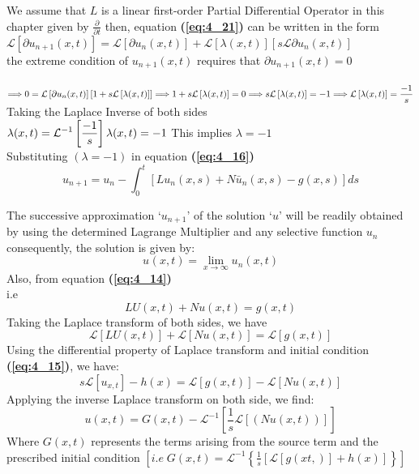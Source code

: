\documentclass[12pt]{report}
\newcommand{\Laplace}{\mathcal{L}}
\newcommand{\sbracket}[1]{\left[#1\right]}
\newcommand{\Un}[2]{u_{#1}(#2)}
\newcommand{\NI}{\noindent}
\newcommand{\InverseL}[1]{\Laplace^{-1}\left[#1\right]}
\newcommand{\LT}[1]{\Laplace \left[#1\right]}
\newcommand{\bt}[1]{\textbf{#1}}
\newcommand{\refn}[1]{\bt{(\ref{#1})}}
\begin{document}
\NI We assume that $L$ is a linear first-order Partial Differential Operator in this chapter given by $\displaystyle \frac{\partial}{\partial t}$ then, equation \refn{eq:4_21} can be written in the form\\[0.2cm]
$\displaystyle
\LT{\partial\Un{n+1}{x,t}} = \LT{\partial\Un{n}{x,t}} + \LT{\lambda(x,t)}\sbracket{s\Laplace \partial\Un{n}{x,t}}
$\\[0.2cm]
the extreme condition of $\Un{n+1}{x,t}$ requires that $\partial\Un{n+1}{x,t} = 0$\\[0.2cm]\
$\displaystyle
\Longrightarrow 0 = \LT{\partial\Un{n}{x,t}}\left[1 + s\LT{\lambda(x,t)}\right] \\[0.2cm]
\Longrightarrow 1 + s\LT{\lambda(x,t)} = 0 \\[0.2cm]
\Longrightarrow s\LT{\lambda(x,t)} = - 1 \\[0.2cm]
\Longrightarrow \LT{\lambda(x,t)} = \frac{-1}{s}
$\\[0.2cm]

\NI Taking the Laplace Inverse of both sides\\[0.2cm]
$\displaystyle
\lambda(x,t) = \InverseL{\frac{-1}{s}} \\[0.2cm]
\lambda(x,t) = - 1  \\[0.2cm]
$
This implies $\lambda = -1$\\[0.3cm]

\NI Substituting $(\lambda = -1)$ in equation \refn{eq:4_16}\\[0.2cm]
\begin{equation}
	u_{n+1} = u_n - \int_{0}^{t} \sbracket{L\Un{n}{x,s} + N\bar{u}_{n}(x,s) - g(x,s)}ds \label{eq:4_22}
\end{equation}

\NI The successive approximation `$u_{n+1}$' of the solution `$u$' will be readily obtained by using the determined Lagrange Multiplier and any selective function $u_n$ consequently, the solution is given by: 
$$
\Un{}{x,t} = \lim\limits_{x \rightarrow \infty}\Un{n}{x,t}
$$
Also, from equation \refn{eq:4_14}\\
i.e\;
\begin{equation}
	LU(x,t) + Nu(x,t) = g(x,t)
\end{equation}
Taking the Laplace transform of both sides, we have
$$
\LT{LU(x,t)} + \LT{Nu(x,t)} = \LT{g(x,t)}
$$
Using the differential property of Laplace transform and initial condition \refn{eq:4_15}, we have:
\begin{equation}
	s\LT{u_{x,t}} - h(x) = \LT{g(x,t)} - \LT{Nu(x,t)} 
\end{equation}
Applying the inverse Laplace transform on both side, we find:
\begin{equation}
	u(x,t) = G(x,t) - \InverseL{\frac{1}{s}\LT{(Nu(x,t))}} \label{eq:4_25}
\end{equation}
Where $G(x,t)$ represents the terms arising from the source term and the prescribed initial condition $\displaystyle \sbracket{ i.e \; G(x,t) = \Laplace^{-1}\left\{\frac{1}{s}\sbracket{\LT{g(xt,)}+ h(x)}\right\}}$\\[0.3cm]
\end{document}
